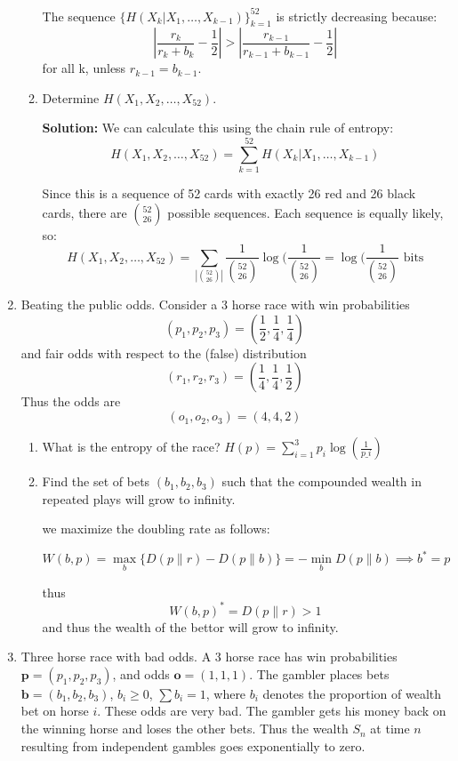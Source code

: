 \documentclass{article}
\begin{document}
\begin{enumerate}
\begin{enumerate}
        The sequence $\{H(X_k|X_1,\ldots,X_{k-1})\}_{k=1}^{52}$ is strictly decreasing because:
        \[
            |\frac{r_k}{r_k+b_k} - \frac{1}{2}| > |\frac{r_{k-1}}{r_{k-1}+b_{k-1}} - \frac{1}{2}|
        \]
        for all k, unless $r_{k-1}=b_{k-1}$.

        \item Determine $H(X_1, X_2, \ldots, X_{52})$.
        
        \textbf{Solution:} We can calculate this using the chain rule of entropy:
        \[
            H(X_1, X_2, \ldots, X_{52}) = \sum_{k=1}^{52} H(X_k|X_1,\ldots,X_{k-1})
        \]
        
        Since this is a sequence of 52 cards with exactly 26 red and 26 black cards, there are $\binom{52}{26}$ possible sequences. Each sequence is equally likely, so:
        \[
            H(X_1, X_2, \ldots, X_{52}) = \sum_{|\binom{52}{26}|} \frac{1}{\binom{52}{26}}\log(\frac{1}{\binom{52}{26}} = \log(\frac{1}{\binom{52}{26}} \text{ bits}
        \]
        
    \end{enumerate}

    \item Beating the public odds. Consider a 3 horse race with win probabilities
    \[
        (p_1, p_2, p_3) = (\frac{1}{2}, \frac{1}{4}, \frac{1}{4})
    \]
    and fair odds with respect to the (false) distribution
    \[
        (r_1, r_2, r_3) = (\frac{1}{4}, \frac{1}{4}, \frac{1}{2})
    \]
    Thus the odds are
    \[
        (o_1, o_2, o_3) = (4, 4, 2)
    \]
    \begin{enumerate}
        \item What is the entropy of the race?
        $H(p) = \sum_{i=1}^{3} p_i \log(\frac{1}{p\_i})$

        \item Find the set of bets $(b_1, b_2, b_3)$ such that the compounded wealth in repeated plays will grow to infinity.
        
        we maximize the doubling rate as follows:

        \[
            W(b, p) = \max_b \{D(p\|r) - D(p\|b)\} = -\min_b D(p\|b) \implies b^* = p
        \]

        thus \[
        W(b, p)^* = D(p\|r) > 1 
        \] 
        and thus the wealth of the bettor will grow to infinity.
    \end{enumerate}

    \item Three horse race with bad odds. A 3 horse race has win probabilities $\mathbf{p} = (p_1, p_2, p_3)$, and odds $\mathbf{o} = (1, 1, 1)$. The gambler places bets $\mathbf{b} = (b_1, b_2, b_3)$, $b_i \geq 0$, $\sum b_i = 1$, where $b_i$ denotes the proportion of wealth bet on horse $i$. These odds are very bad. The gambler gets his money back on the winning horse and loses the other bets. Thus the wealth $S_n$ at time $n$ resulting from independent gambles goes exponentially to zero.


\end{enumerate}
\end{document}
